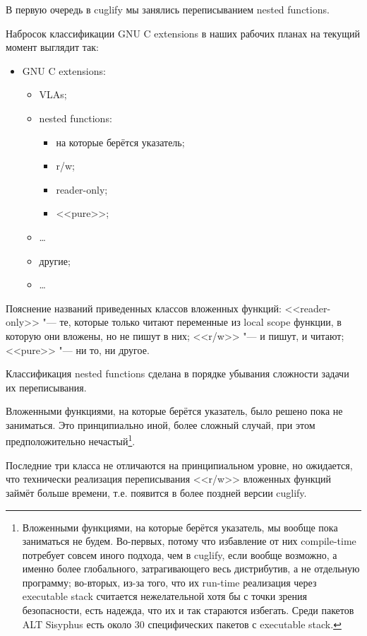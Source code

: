 \documentclass[10pt, a5paper]{article}
\begin{document}
В первую очередь в cuglify мы занялись переписыванием nested functions.

Набросок классификации GNU C extensions в наших рабочих планах на текущий момент выглядит так:

\begin{itemize}
  \item GNU C extensions:\begin{itemize}
  \item VLAs;
  \item nested functions:\begin{itemize}
  \item на которые берётся указатель;
  \item r/w;
  \item reader-only;
  \item <<pure>>;
\end{itemize}


  \item \ldots{}
  \item другие;
  \item \ldots{}
\end{itemize}


\end{itemize}

Пояснение названий приведенных классов вложенных функций: <<reader-only>> "--- те, которые только читают переменные из local scope функции, в которую они вложены, но не пишут в них; <<r/w>> "--- и пишут, и читают; <<pure>> "--- ни то, ни другое.

Классификация nested functions сделана в порядке убывания сложности задачи их переписывания.

Вложенными функциями, на которые берётся указатель, было решено пока не заниматься. Это принципиально иной, более сложный случай, при этом предположительно нечастый\footnote{Вложенными функциями, на которые берётся указатель, мы вообще пока заниматься не будем. Во-первых, потому что избавление от них compile-time потребует совсем иного подхода, чем в cuglify, если вообще возможно, а именно более глобального, затрагивающего весь дистрибутив, а не отдельную программу; во-вторых, из-за того, что их run-time реализация через executable stack считается нежелательной хотя бы с точки зрения безопасности, есть надежда, что их и так стараются избегать. Среди пакетов ALT Sisyphus есть около 30 специфических пакетов с executable stack.}.

Последние три класса не отличаются на принципиальном уровне, но ожидается, что технически реализация переписывания <<r/w>> вложенных функций займёт больше времени, т.е. появится в более поздней версии cuglify.
\end{document}
